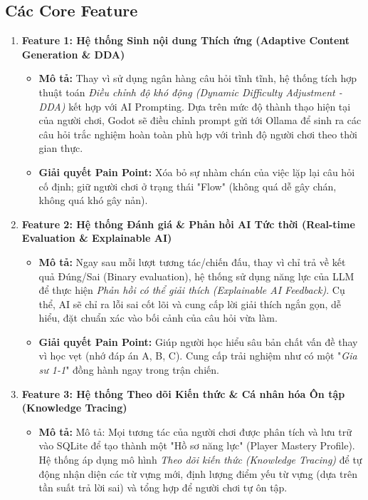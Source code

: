 \subsection{Các Core Feature}


\begin{enumerate}
	\item \textbf{Feature 1: Hệ thống Sinh nội dung Thích ứng (Adaptive Content Generation \& DDA)} 
	
	\begin{itemize}
		\item \textbf{Mô tả:} Thay vì sử dụng ngân hàng câu hỏi tĩnh tĩnh, hệ thống tích hợp thuật toán \textit{Điều chỉnh độ khó động (Dynamic Difficulty Adjustment - DDA)} kết hợp với AI Prompting. Dựa trên mức độ thành thạo hiện tại của người chơi, Godot sẽ điều chỉnh prompt gửi tới Ollama để sinh ra các câu hỏi trắc nghiệm hoàn toàn phù hợp với trình độ người chơi theo thời gian thực.
		\item \textbf{Giải quyết Pain Point:} Xóa bỏ sự nhàm chán của việc lặp lại câu hỏi cố định; giữ người chơi ở trạng thái "Flow" (không quá dễ gây chán, không quá khó gây nản).
	\end{itemize}
	\item  \textbf{Feature 2: Hệ thống Đánh giá \& Phản hồi AI Tức thời (Real-time Evaluation \& Explainable AI)}
	\begin{itemize}
		\item \textbf{Mô tả:} Ngay sau mỗi lượt tương tác/chiến đấu, thay vì chỉ trả về kết quả Đúng/Sai (Binary evaluation), hệ thống sử dụng năng lực của LLM để thực hiện \textit{Phản hồi có thể giải thích (Explainable AI Feedback)}. Cụ thể, AI sẽ chỉ ra lỗi sai cốt lõi và cung cấp lời giải thích ngắn gọn, dễ hiểu, đặt chuẩn xác vào bối cảnh của câu hỏi vừa làm.
		\item \textbf{Giải quyết Pain Point:} Giúp người học hiểu sâu bản chất vấn đề thay vì học vẹt (nhớ đáp án A, B, C). Cung cấp trải nghiệm như có một "\textit{Gia sư 1-1}" đồng hành ngay trong trận chiến.
	\end{itemize}
	\item \textbf{Feature 3: Hệ thống Theo dõi Kiến thức \& Cá nhân hóa Ôn tập (Knowledge Tracing)} 
	\begin{itemize}
		\item \textbf{Mô tả:} Mô tả: Mọi tương tác của người chơi được phân tích và lưu trữ vào SQLite để tạo thành một "Hồ sơ năng lực" (Player Mastery Profile). Hệ thống áp dụng mô hình \textit{Theo dõi kiến thức (Knowledge Tracing)} để tự động nhận diện các từ vựng mới, định lượng điểm yếu từ vựng (dựa trên tần suất trả lời sai) và  tổng hợp để người chơi tự ôn tập.

\end{itemize}
\end{enumerate}
